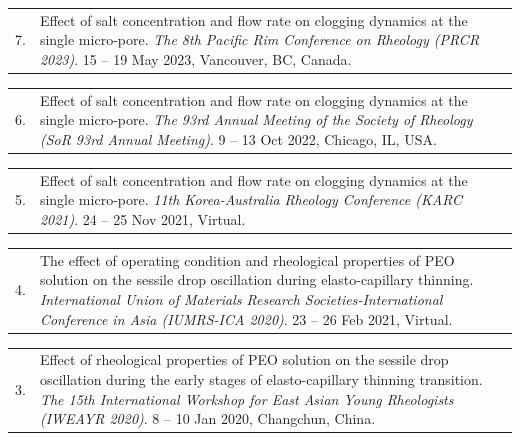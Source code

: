 \documentclass[11pt, a4paper]{article}
\makeatletter
\newenvironment{pubitem}[2]{%
  \begin{tabularx}{\textwidth}{@{}p{1cm}X@{}}
  #1 & #2 \\
  \end{tabularx}
}{}
\makeatother
\begin{document}
    \vspace{0.3em}
    
    \begin{pubitem}{7.}{Effect of salt concentration and flow rate on clogging dynamics at the single micro-pore. 
    \textit{The 8th Pacific Rim Conference on Rheology (PRCR 2023)}. 15 – 19 May 2023, Vancouver, BC, Canada.}
    \end{pubitem}
    
    \vspace{0.3em}
    
    \begin{pubitem}{6.}{Effect of salt concentration and flow rate on clogging dynamics at the single micro-pore. 
    \textit{The 93rd Annual Meeting of the Society of Rheology (SoR 93rd Annual Meeting)}. 9 – 13 Oct 2022, Chicago, IL, USA.}
    \end{pubitem}
    
    \vspace{0.3em}
    
    \begin{pubitem}{5.}{Effect of salt concentration and flow rate on clogging dynamics at the single micro-pore. 
    \textit{11th Korea-Australia Rheology Conference (KARC 2021)}. 24 – 25 Nov 2021, Virtual.}
    \end{pubitem}
    
    \vspace{0.3em}
    
    \begin{pubitem}{4.}{The effect of operating condition and rheological properties of PEO solution on the sessile drop oscillation during elasto-capillary thinning. 
    \textit{International Union of Materials Research Societies-International Conference in Asia (IUMRS-ICA 2020)}. 23 – 26 Feb 2021, Virtual.}
    \end{pubitem}
    
    \vspace{0.3em}
    
    \begin{pubitem}{3.}{Effect of rheological properties of PEO solution on the sessile drop oscillation during the early stages of elasto-capillary thinning transition. 
    \textit{The 15th International Workshop for East Asian Young Rheologists (IWEAYR 2020)}. 8 – 10 Jan 2020, Changchun, China.}
    \end{pubitem}
    
    \vspace{0.3em}
    
\end{document}
